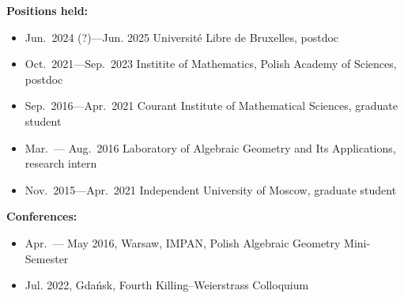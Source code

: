 \documentclass{article}
\begin{document}
\begin{description}
\item {\bf Positions held:} \begin{itemize}
     \item Jun.~2024 (?)---Jun.  2025 \hspace{2mm} Universit\'e Libre de Bruxelles,  postdoc
     \item Oct.~2021---Sep.~2023 \hspace{2mm} Institite of Mathematics,  Polish Academy of Sciences,  postdoc
     \item Sep.~2016---Apr.~2021 \hspace{2mm} Courant Institute of Mathematical Sciences,
     graduate student
     \item Mar.~--- Aug.~2016 \hspace{2mm} Laboratory of Algebraic Geometry
	and Its Applications, research intern
     \item Nov.~2015---Apr.~2021 \hspace{2mm} Independent University of Moscow,
     graduate student
\end{itemize}

\vspace{1mm}

\item {\bf Conferences:} \begin{itemize}
\item Apr.~--- May 2016,  Warsaw,  IMPAN,  Polish Algebraic Geometry Mini-Semester
\item Jul.  2022,  Gda\'nsk,  Fourth Killing--Weierstrass Colloquium
\end{itemize}

\vspace{1mm}


\end{description}
\end{document}
